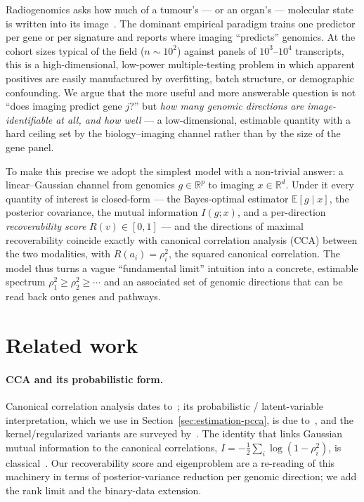 \documentclass{article}
\newcommand{\R}{\mathbb{R}}
\newcommand{\E}{\mathbb{E}}
\begin{document}
Radiogenomics asks how much of a tumour's --- or an organ's --- molecular state
is written into its image~\citep{rutman2009radiogenomics,gillies2016radiomics,lambin2017radiomics,bodalal2019radiogenomics}.
The dominant empirical paradigm trains one predictor per gene or per signature
and reports where imaging ``predicts'' genomics. At the cohort sizes typical of
the field ($n\sim 10^2$) against panels of $10^3$--$10^4$ transcripts, this is a
high-dimensional, low-power multiple-testing problem in which apparent positives
are easily manufactured by overfitting, batch structure, or demographic
confounding. We argue that the more useful and more answerable question is not
``does imaging predict gene $j$?'' but \emph{how many genomic directions are
image-identifiable at all, and how well} --- a low-dimensional, estimable
quantity with a hard ceiling set by the biology--imaging channel rather than by
the size of the gene panel.

To make this precise we adopt the simplest model with a non-trivial answer: a
linear--Gaussian channel from genomics $g\in\R^p$ to imaging $x\in\R^d$. Under
it every quantity of interest is closed-form --- the Bayes-optimal estimator
$\E[g\mid x]$, the posterior covariance, the mutual information $I(g;x)$, and a
per-direction \emph{recoverability score} $R(v)\in[0,1]$ --- and the directions
of maximal recoverability coincide exactly with canonical correlation analysis
(CCA) between the two modalities, with $R(a_i)=\rho_i^2$, the squared canonical
correlation. The model thus turns a vague ``fundamental limit'' intuition into a
concrete, estimable spectrum $\rho_1^2\ge\rho_2^2\ge\cdots$ and an associated set
of genomic directions that can be read back onto genes and pathways.

\section{Related work}
\label{sec:related}

\paragraph{CCA and its probabilistic form.}
Canonical correlation analysis dates to~\citet{hotelling1936cca}; its
probabilistic / latent-variable interpretation, which we use in
Section~\ref{sec:estimation-pcca}, is due to~\citet{bach2005pcca}, and the
kernel/regularized variants are surveyed by~\citet{hardoon2004kcca}. The
identity that links Gaussian mutual information to the canonical correlations,
$I=-\tfrac12\sum_i\log(1-\rho_i^2)$, is classical~\citep{cover2006elements}. Our
recoverability score and eigenproblem are a re-reading of this machinery in
terms of posterior-variance reduction per genomic direction; we add the rank
limit and the binary-data extension.
\end{document}
